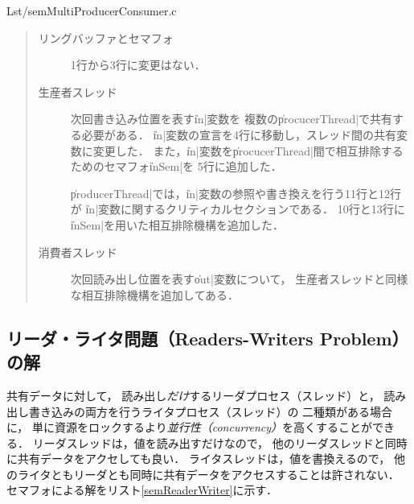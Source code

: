 
                {Lst/semMultiProducerConsumer.c}

\begin{quote}
  \begin{description}
  \item [リングバッファとセマフォ]
    1行から3行に変更はない．

  \item [生産者スレッド]
    次回書き込み位置を表す\|in|変数を
    複数の\|procucerThread|で共有する必要がある．
    \|in|変数の宣言を4行に移動し，スレッド間の共有変数に変更した．
    また，\|in|変数を\|procucerThread|間で相互排除するためのセマフォ\|inSem|を
    5行に追加した．

    \|producerThread|では，\|in|変数の参照や書き換えを行う11行と12行が
    \|in|変数に関するクリティカルセクションである．
    10行と13行に\|inSem|を用いた相互排除機構を追加した．

  \item [消費者スレッド]
    次回読み出し位置を表す\|out|変数について，
    生産者スレッドと同様な相互排除機構を追加してある．
  \end{description}
\end{quote}

\subsection{リーダ・ライタ問題（Readers-Writers Problem）の解}
\label{readersWritersProglem}
共有データに対して，
読み出し\emph{だけ}するリーダプロセス（スレッド）と，
読み出し書き込みの両方を行うライタプロセス（スレッド）の
二種類がある場合に，
単に資源をロックするより\emph{並行性（concurrency）}を高くすることができる．
リーダスレッドは，値を読み出すだけなので，
他のリーダスレッドと同時に共有データをアクセしても良い．
ライタスレッドは，値を書換えるので，
他のライタともリーダとも同時に共有データをアクセスすることは許されない．
セマフォによる解をリスト\ref{semReaderWriter}に示す．




